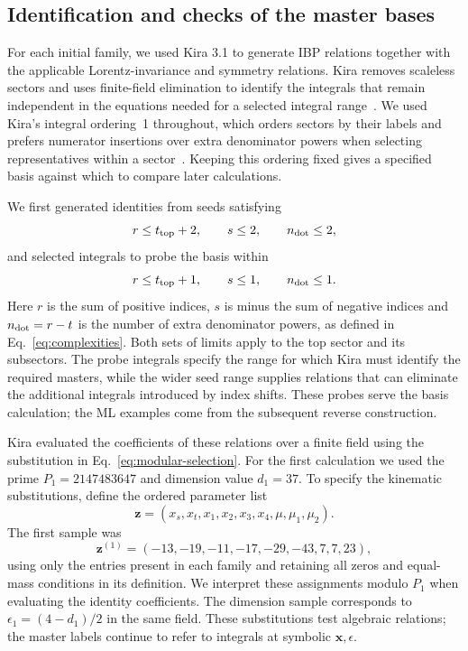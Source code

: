 \documentclass[11pt,a4paper]{article}
\begin{document}
\subsection{Identification and checks of the master bases}
\label{sec:master-basis-checks}
For each initial family, we used Kira 3.1 to generate IBP relations together
with the applicable Lorentz-invariance and symmetry relations.
Kira removes scaleless sectors and uses finite-field elimination
to identify the integrals that remain independent in the equations
needed for a selected integral range~\cite{KiraOriginal,Kira3}.
We used Kira's integral ordering~1 throughout, which orders sectors
by their labels and prefers numerator insertions over extra
denominator powers when selecting representatives within a
sector~\cite{Kira12}. Keeping this ordering fixed gives a specified
basis against which to compare later calculations.

We first generated identities from seeds satisfying
\begin{equation}
 r\leq t_{\rm top}+2,\qquad s\leq2,\qquad
 n_{\rm dot}\leq2,
 \label{eq:master-discovery-seeds}
\end{equation}
and selected integrals to probe the basis within
\begin{equation}
 r\leq t_{\rm top}+1,\qquad s\leq1,\qquad
 n_{\rm dot}\leq1.
 \label{eq:master-discovery-probes}
\end{equation}
Here $r$ is the sum of positive indices, $s$ is minus the sum of
negative indices and $n_{\rm dot}=r-t$ is the number of extra
denominator powers, as defined in Eq.~\eqref{eq:complexities}.
Both sets of limits apply to the top sector and its subsectors.
The probe integrals specify the range for which Kira must identify
the required masters, while the wider seed range supplies relations
that can eliminate the additional integrals introduced by index
shifts. These probes serve the basis calculation; the ML examples
come from the subsequent reverse construction.

Kira evaluated the coefficients of these relations over a finite
field using the substitution in Eq.~\eqref{eq:modular-selection}.
For the first calculation we used the prime $P_1=2147483647$ and
dimension value $d_1=37$. To specify the kinematic substitutions,
define the ordered parameter list
\begin{equation}
 \boldsymbol z=(x_s,x_t,x_1,x_2,x_3,x_4,\mu,\mu_1,\mu_2).
 \label{eq:master-sample-parameters}
\end{equation}
The first sample was
\begin{equation}
 \boldsymbol z^{(1)}=(-13,-19,-11,-17,-29,-43,7,7,23),
 \label{eq:master-first-sample}
\end{equation}
using only the entries present in each family and retaining all
zeros and equal-mass conditions in its definition. We interpret
these assignments modulo $P_1$ when evaluating the identity
coefficients. The dimension sample corresponds to
$\epsilon_1=(4-d_1)/2$ in the same field. These substitutions
test algebraic relations; the master labels continue to refer to
integrals at symbolic $\boldsymbol x,\epsilon$.
\end{document}
